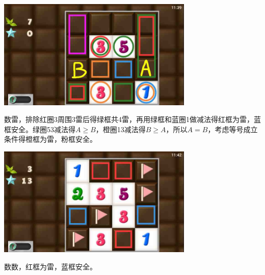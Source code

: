 \subsection{} %
\begin{center}
    \includegraphics[width=0.7\textwidth]{puzzlelow/130-1.jpg}
\end{center}
数雷，排除红圈3周围3雷后得绿框共4雷，再用绿框和蓝圈1做减法得红框为雷，蓝框安全。绿圈53减法得$A\ge B$，橙圈13减法得$B\ge A$，所以$A=B$，考虑等号成立条件得橙框为雷，粉框安全。
\begin{center}
    \includegraphics[width=0.7\textwidth]{puzzlelow/130-2.jpg}
\end{center}
数数，红框为雷，蓝框安全。

